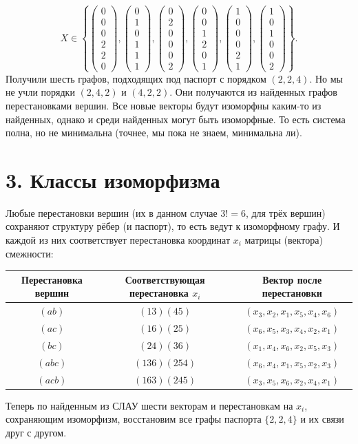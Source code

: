 \documentclass[12pt,a4paper]{article}
\newcommand{\col}[1]{\begin{pmatrix}#1\end{pmatrix}}
\begin{document}
\[
X\in\left\{
\col{0\\0\\0\\2\\2\\0},
\col{0\\1\\0\\1\\1\\1},
\col{0\\2\\0\\0\\0\\2},
\col{0\\0\\1\\2\\0\\1},
\col{1\\0\\0\\0\\2\\1},
\col{1\\0\\1\\0\\0\\2}
\right\}.
\]
Получили шесть графов, подходящих под паспорт с порядком $(2,2,4)$.
Но мы не учли порядки $(2,4,2)$ и $(4,2,2)$.
Они получаются из найденных графов перестановками вершин.
Все новые векторы будут изоморфны каким-то из найденных, однако и среди
найденных могут быть изоморфные. То есть система полна, но не минимальна
(точнее, мы пока не знаем, минимальна ли).

\newpage
\section*{3. Классы изоморфизма}
Любые перестановки вершин (их в данном случае $3!=6$, для трёх вершин)
сохраняют структуру рёбер (и паспорт), то есть ведут к изоморфному графу.
И каждой из них соответствует перестановка координат $x_i$ матрицы
(вектора) смежности:
\begin{center}
\begin{tabular}{ccc}
\toprule
Перестановка вершин & Соответствующая перестановка $x_i$ & Вектор после перестановки\\
\midrule
$(ab)$ & $(13)(45)$ & $(x_3,x_2,x_1,x_5,x_4,x_6)$\\
$(ac)$ & $(16)(25)$ & $(x_6,x_5,x_3,x_4,x_2,x_1)$\\
$(bc)$ & $(24)(36)$ & $(x_1,x_4,x_6,x_2,x_5,x_3)$\\
$(abc)$ & $(136)(254)$ & $(x_6,x_4,x_1,x_5,x_2,x_3)$\\
$(acb)$ & $(163)(245)$ & $(x_3,x_5,x_6,x_2,x_4,x_1)$\\
\bottomrule
\end{tabular}
\end{center}
Теперь по найденным из СЛАУ шести векторам и перестановкам на $x_i$,
сохраняющим изоморфизм, восстановим все графы паспорта $\{2,2,4\}$
и их связи друг с другом.
\end{document}
